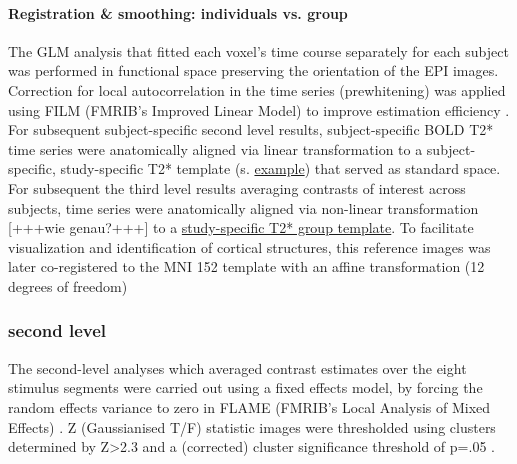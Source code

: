 \documentclass[english]{article}
\begin{document}
\paragraph{Registration \& smoothing: individuals vs. group}
The GLM analysis that fitted each voxel's time course separately for each subject was performed in functional space preserving the orientation of the EPI images. Correction for local autocorrelation in the time series (prewhitening) was applied using FILM (FMRIB's Improved Linear Model) to improve estimation efficiency \citep{woolrich2001autocorr}.
For subsequent subject-specific second level results, subject-specific BOLD T2* time series were anatomically aligned via linear transformation to a subject-specific, study-specific T2* template (s. \href{"https://github.com/psychoinformatics-de/studyforrest-data-templatetransforms/blob/master/sub-01/bold3Tp2/brain.nii.gz"}{example}) that served as standard space.
For subsequent the third level results averaging contrasts of interest across subjects, time series were anatomically aligned via non-linear transformation [+++wie genau?+++] to a \href{"https://github.com/psychoinformatics-de/studyforrest-data-templatetransforms/blob/master/templates/grpbold3Tp2/brain.nii.gz"}{study-specific T2* group template}.
To facilitate visualization and identification of cortical structures, this reference images was later co-registered to the MNI 152 template with an affine transformation (12 degrees of freedom)
\subsubsection{second level}
The second-level analyses which averaged contrast estimates over the eight stimulus segments were carried out using a fixed effects model, by forcing the random effects variance to zero in FLAME (FMRIB's Local Analysis of Mixed Effects) \citep{beckmann2003general, woolrich2004multilevel}. Z (Gaussianised T/F) statistic images were thresholded using clusters determined by Z>2.3 and a (corrected) cluster significance threshold of p=.05 \citep{worsley2001statistical}.
\end{document}
